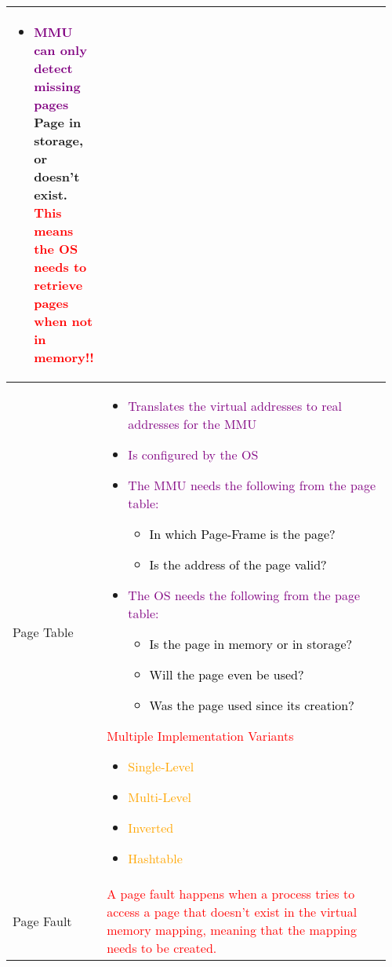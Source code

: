 \documentclass[main.tex,fontsize=8pt,paper=a4,paper=portrait,DIV=calc,]{scrartcl}
\begin{document}
\begin{table}[ht!]
\begin{tabular}{|m{0.2\linewidth}|m{0.755\linewidth}|}
\begin{itemize}
\item \textcolor{purple}{MMU can only detect missing pages}\newline
  Page in storage, or doesn't exist.\newline
  \textcolor{red}{This means the OS needs to retrieve pages when not in memory!!}
\vspace{-3mm}
\end{itemize} 
\\
\hline
Page Table & 
\vspace{2mm}
\begin{itemize}
\item \textcolor{purple}{Translates the virtual addresses to real addresses for the MMU}
\item \textcolor{purple}{Is configured by the OS}
\item \textcolor{purple}{The MMU needs the following from the page table:}\newline
  \begin{itemize}
  \item \textcolor{black}{In which Page-Frame is the page?}
  \item \textcolor{black}{Is the address of the page valid?}
  \end{itemize} 
\item \textcolor{purple}{The OS needs the following from the page table:}\newline
  \begin{itemize}
  \item \textcolor{black}{Is the page in memory or in storage?}
  \item \textcolor{black}{Will the page even be used?}
  \item \textcolor{black}{Was the page used since its creation?}
  \end{itemize} 
\end{itemize}
\textcolor{red}{Multiple Implementation Variants}
\begin{itemize}
\item \textcolor{orange}{Single-Level}
\item \textcolor{orange}{Multi-Level}
\item \textcolor{orange}{Inverted}
\item \textcolor{orange}{Hashtable}
\vspace{-3mm}
\end{itemize} 
\\
\hline
Page Fault & 
\textcolor{red}{A page fault happens when a process tries to access a page that doesn't exist in the virtual memory mapping, meaning that the mapping needs to be created.}
\\
\hline
\end{tabular}
\end{table}
\end{document}
